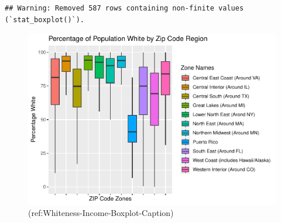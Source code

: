 \documentclass[
  man]{apa6}
\begin{document}
\begin{verbatim}
## Warning: Removed 587 rows containing non-finite values (`stat_boxplot()`).
\end{verbatim}

\begin{figure}
\centering
\includegraphics{Zip_Analysis_files/figure-latex/Whiteness-Income-Boxplot-1.pdf}
\caption{\label{fig:Whiteness-Income-Boxplot}(ref:Whiteness-Income-Boxplot-Caption)}
\end{figure}
\end{document}
